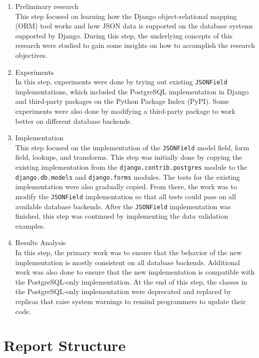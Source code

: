 \begin{enumerate}
    \item Preliminary research \\
    This step focused on learning how the Django object-relational mapping
    (ORM) tool works and how JSON data is supported on the database systems
    supported by Django. During this step, the underlying concepts of this
    research were studied to gain some insights on how to accomplish the
    research objectives.

    \item Experiments \\
    In this step, experiments were done by trying out existing \verb|JSONField|
    implementations, which included the PostgreSQL implementation in Django and
    third-party packages on the Python Package Index (PyPI). Some experiments
    were also done by modifying a third-party package to work better on
    different database backends.

    \item Implementation \\
    This step focused on the implementation of the \verb|JSONField| model
    field, form field, lookups, and transforms. This step was initially done by
    copying the existing implementation from the \verb|django.contrib.postgres|
    module to the \verb|django.db.models| and \verb|django.forms| modules. The
    tests for the existing implementation were also gradually copied. From
    there, the work was to modify the \verb|JSONField| implementation so that
    all tests could pass on all available database backends. After the
    \verb|JSONField| implementation was finished, this step was continued by
    implementing the data validation examples.

    \item Results Analysis \\
    In this step, the primary work was to ensure that the behavior of the new
    implementation is mostly consistent on all database backends. Additional
    work was also done to ensure that the new implementation is compatible with
    the PostgreSQL-only implementation. At the end of this step, the classes in
    the PostgreSQL-only implementation were deprecated and replaced by replicas
    that raise system warnings to remind programmers to update their code.
\end{enumerate}

\section{Report Structure}

